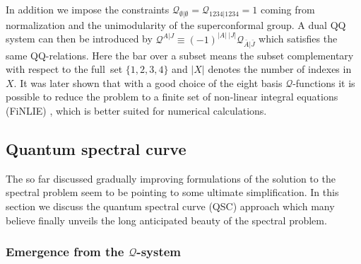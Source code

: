 In addition we impose the constraints $\mathcal{Q}_{\emptyset |\emptyset}=\mathcal{Q}_{1234|1234}=1$ coming from normalization and the unimodularity of the superconformal group.
A dual QQ system can then be introduced by $\mathcal{Q}^{A|J}\equiv (-1)^{|A|\;|J|}\mathcal{Q}_{\bar A|\bar J}$ which satisfies the same QQ-relations.
Here  the bar over a subset means the subset complementary with respect to the full~set $\{1,2,3,4\}$ and  $|X|$ denotes the number of indexes in $X$. 
It was later shown that with a good choice of the eight basis $\mathcal{Q}$-functions it is possible to reduce the problem to a finite set of non-linear integral equations (FiNLIE) \cite{Gromov:2011cx}, which is better suited for numerical calculations.

\subsection{Quantum spectral curve}
\label{sec:pmu_system}

The so far discussed gradually improving formulations of the solution to the spectral problem seem to be pointing to some ultimate simplification.
In this section we discuss the quantum spectral curve (QSC) approach which many believe finally unveils the long anticipated beauty of the spectral problem.

\subsubsection{Emergence from the $\mathcal{Q}$-system}

